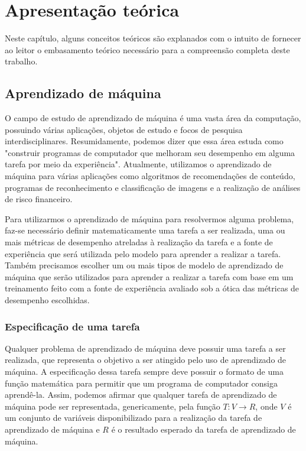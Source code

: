 \chapter{Apresentação teórica} \label{chap:apresentacao_teorica}

Neste capítulo, alguns conceitos teóricos são explanados com o intuito de fornecer ao leitor o embasamento teórico necessário para a compreensão completa deste trabalho.

\section{Aprendizado de máquina}

O campo de estudo de aprendizado de máquina é uma vasta área da computação, possuindo várias aplicações, objetos de estudo e focos de pesquisa interdisciplinares. Resumidamente, podemos dizer que essa área estuda como "construir programas de computador que melhoram seu desempenho em alguma tarefa por meio da experiência"\cite[p.29]{machine_learning}. Atualmente, utilizamos o aprendizado de máquina para várias aplicações como algoritmos de recomendações de conteúdo, programas de reconhecimento e classificação de imagens e a realização de análises de risco financeiro.

Para utilizarmos o aprendizado de máquina para resolvermos alguma problema, faz-se necessário definir matematicamente uma tarefa a ser realizada, uma ou mais métricas de desempenho atreladas à realização da tarefa e a fonte de experiência que será utilizada pelo modelo para aprender a realizar a tarefa\cite[p.29]{machine_learning}. Também precisamos escolher um ou mais tipos de modelo de aprendizado de máquina que serão utilizados para aprender a realizar a tarefa com base em um treinamento feito com a fonte de experiência avaliado sob a ótica das métricas de desempenho escolhidas.

\subsection{Especificação de uma tarefa}

Qualquer problema de aprendizado de máquina deve possuir uma tarefa a ser realizada, que representa o objetivo a ser atingido pelo uso de aprendizado de máquina. A especificação dessa tarefa sempre deve possuir o formato de uma função matemática para permitir que um programa de computador consiga aprendê-la. Assim, podemos afirmar que qualquer tarefa de aprendizado de máquina pode ser representada, genericamente, pela função $T : V \rightarrow R$, onde $V$ é um conjunto de variáveis disponibilizado para a realização da tarefa de aprendizado de máquina e $R$ é o resultado esperado da tarefa de aprendizado de máquina.

